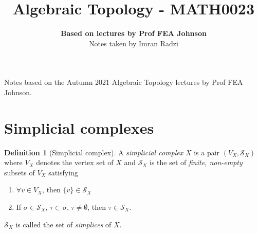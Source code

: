 \documentclass[a4paper,14pt]{extarticle}
\theoremstyle{definition}
\newtheorem*{definition}{Definition}
\begin{document}
\title{\textbf{Algebraic Topology - MATH0023}}
\author{\textbf{Based on lectures by Prof FEA Johnson}\\ Notes taken by Imran Radzi}
\date{}
\maketitle

Notes based on the Autumn 2021 Algebraic Topology lectures by Prof FEA Johnson. 
\begingroup
\let\cleardoublepage\clearpage
\tableofcontents
\endgroup
\newpage
{}

\vspace{12pt}

\section{Simplicial complexes}

\begin{definition}[Simplicial complex]
	A \emph{simplicial complex} $X$ is a pair $(V_X,\mathcal{S}_X)$ where $V_X$ denotes the vertex set of $X$ and $\mathcal{S}_X$ is the set of
	\textit{finite, non-empty} subsets of $V_X$ satisfying
	\begin{enumerate}
		\item $\forall v\in V_X$, then $\{v\}\in\mathcal{S}_X$
		\item If $\sigma\in\mathcal{S}_X, \,\tau\subset\sigma, \,\tau\neq\emptyset$, then $\tau\in\mathcal{S}_X$. 
	\end{enumerate}
	$\mathcal{S}_X$ is called the set of \textit{simplices} of $X$.
\end{definition}
\end{document}
